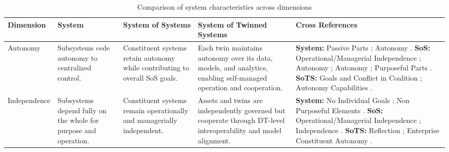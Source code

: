 \begin{table}[htbp]
\centering
\caption{Comparison of system characteristics across \citet{nielsen2015systems} dimensions}
\label{tab:sys_sos_sots_comparison}
\tiny
\renewcommand{\arraystretch}{1.15}
\setlength{\tabcolsep}{3pt}

\begin{adjustbox}{center}
\begin{tabularx}{1.15\textwidth}{
  >{\raggedright\arraybackslash}p{2.5cm}
  >{\raggedright\arraybackslash}p{3cm}
  >{\raggedright\arraybackslash}p{3cm}
  >{\raggedright\arraybackslash}p{3.7cm}
  >{\raggedright\arraybackslash}X }
\hline
\textbf{Dimension} & 
\textbf{System} & 
\textbf{System of Systems} & 
\textbf{System of Twinned Systems} &
\textbf{Cross References}\\
\hline

Autonomy &
Subsystems cede autonomy to centralized control. &
Constituent systems retain autonomy while contributing to overall SoS goals. &
Each twin maintains autonomy over its data, models, and analytics, enabling self-managed operation and cooperation. &
\textbf{System:} Passive Parts \cite{jackson1984towards}; Autonomy \cite{boardman2006system}.\newline
\textbf{SoS:} Operational/Managerial Independence \cite{maier1998architecting}; Autonomy \cite{boardman2006system}; Autonomy \cite{nielsen2015systems}; Purposeful Parts \cite{jackson1984towards}.\newline
\textbf{SoTS:} Goals and Conflict in Coalition \cite{borth2019digital}; Autonomy Capabilities \cite{dietz2020digital}. \\

\hline

Independence &
Subsystems depend fully on the whole for purpose and operation. &
Constituent systems remain operationally and managerially independent. &
Assets and twins are independently governed but cooperate through DT-level interoperability and model alignment. &
\textbf{System:} No Individual Goals \cite{jackson1984towards}; Non Purposeful Elements \cite{ackoff1971towards}.\newline
\textbf{SoS:} Operational/Managerial Independence \cite{maier1998architecting}; Independence \cite{nielsen2015systems}.\newline
\textbf{SoTS:} Reflection \cite{borth2019digital}; Enterprise Constituent Autonomy \cite{dietz2020digital}. \\

\hline


\end{tabularx}
\end{adjustbox}
\end{table}
